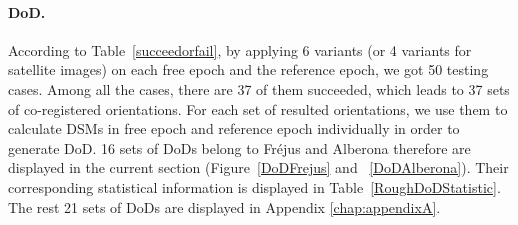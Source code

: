 %
%		
%		

\paragraph{\ac{DoD}.}
\label{sec:RoughDoDMainBody}
According to Table~\ref{succeedorfail}, by applying 6 variants (or 4 variants for satellite images) on each free epoch and the reference epoch, we got 50 testing cases. Among all the cases, there are 37 of them succeeded, which leads to 37 sets of co-registered orientations. For each set of resulted orientations, we use them to calculate \ac{DSM}s in free epoch and reference epoch individually in order to generate \ac{DoD}.
16 sets of \ac{DoD}s belong to Fr{\'e}jus and Alberona therefore are displayed in the current section (Figure~\ref{DoDFrejus} and ~\ref{DoDAlberona}). Their corresponding statistical information is displayed in Table~\ref{RoughDoDStatistic}. The rest 21 sets of \ac{DoD}s are displayed in Appendix \ref{chap:appendixA}. \\

